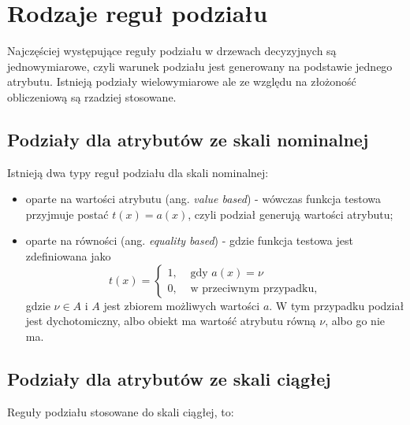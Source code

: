 \documentclass[]{book}
\providecommand{\tightlist}{%
  \setlength{\itemsep}{0pt}\setlength{\parskip}{0pt}}
\theoremstyle{plain}
\theoremstyle{definition}
\theoremstyle{definition}
\theoremstyle{definition}
\theoremstyle{definition}
\theoremstyle{remark}
\begin{document}
\hypertarget{rodzaje-regu-podziau}{%
\section{Rodzaje reguł podziału}\label{rodzaje-regu-podziau}}

Najczęściej występujące reguły podziału w drzewach decyzyjnych są jednowymiarowe, czyli warunek podziału jest generowany na podstawie jednego atrybutu. Istnieją podziały wielowymiarowe ale ze względu na złożoność obliczeniową są rzadziej stosowane.

\hypertarget{podziay-dla-atrybutow-ze-skali-nominalnej}{%
\subsection{Podziały dla atrybutów ze skali nominalnej}\label{podziay-dla-atrybutow-ze-skali-nominalnej}}

Istnieją dwa typy reguł podziału dla skali nominalnej:

\begin{itemize}
\tightlist
\item
  oparte na wartości atrybutu (ang. \emph{value based}) - wówczas funkcja testowa przyjmuje postać \(t(x)=a(x)\), czyli podział generują wartości atrybutu;
\item
  oparte na równości (ang. \emph{equality based}) - gdzie funkcja testowa jest zdefiniowana jako
  \begin{equation}
    t(x)= \begin{cases}
        1, &\text{ gdy } a(x)=\nu\\
        0, & \text{ w przeciwnym przypadku},
    \end{cases}
  \end{equation}
  gdzie \(\nu\in A\) i \(A\) jest zbiorem możliwych wartości \(a\). W tym przypadku podział jest dychotomiczny, albo obiekt ma wartość atrybutu równą \(\nu\), albo go nie ma.
\end{itemize}

\hypertarget{podziay-dla-atrybutow-ze-skali-ciagej}{%
\subsection{Podziały dla atrybutów ze skali ciągłej}\label{podziay-dla-atrybutow-ze-skali-ciagej}}

Reguły podziału stosowane do skali ciągłej, to:
\end{document}
